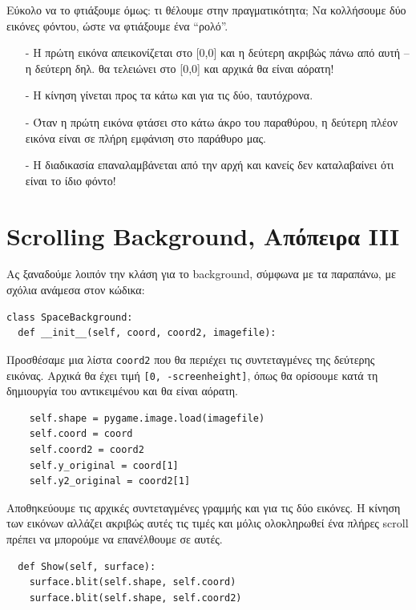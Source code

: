 Εύκολο να το φτιάξουμε όμως: τι θέλουμε στην πραγματικότητα;  Να κολλήσουμε δύο εικόνες φόντου, ώστε να φτιάξουμε ένα ``ρολό''.
%
\begin{itemize}
\item[-] Η πρώτη εικόνα απεικονίζεται στο [0,0] και η δεύτερη ακριβώς πάνω από αυτή -- η δεύτερη δηλ. θα τελειώνει στο [0,0] και αρχικά θα είναι αόρατη!
\item[-] Η κίνηση γίνεται προς τα κάτω και για τις δύο, ταυτόχρονα.
\item[-] Όταν η πρώτη εικόνα φτάσει στο κάτω άκρο του παραθύρου, η δεύτερη πλέον εικόνα είναι σε πλήρη εμφάνιση στο παράθυρο μας.
\item[-] Η διαδικασία επαναλαμβάνεται από την αρχή και κανείς δεν καταλαβαίνει ότι είναι το ίδιο φόντο!
\end{itemize}
%
%
\section{Scrolling Background, Απόπειρα III}
%
Ας ξαναδούμε λοιπόν την κλάση για το background, σύμφωνα με τα παραπάνω, με σχόλια ανάμεσα στον κώδικα:

\begin{verbatim}
class SpaceBackground:
  def __init__(self, coord, coord2, imagefile):
\end{verbatim}

Προσθέσαμε μια λίστα {\tt coord2} που θα περιέχει τις συντεταγμένες της δεύτερης εικόνας. Αρχικά θα έχει τιμή {\tt [0, -screenheight]}, όπως θα ορίσουμε κατά τη δημιουργία του αντικειμένου και θα είναι αόρατη.

\begin{verbatim}
    self.shape = pygame.image.load(imagefile)
    self.coord = coord
    self.coord2 = coord2
    self.y_original = coord[1]
    self.y2_original = coord2[1]
\end{verbatim}

Αποθηκεύουμε τις αρχικές συντεταγμένες γραμμής και για τις δύο εικόνες. Η κίνηση των εικόνων αλλάζει ακριβώς αυτές τις τιμές και μόλις ολοκληρωθεί ένα πλήρες scroll πρέπει να μπορούμε να επανέλθουμε σε αυτές. 

\begin{verbatim}
  def Show(self, surface):
    surface.blit(self.shape, self.coord)
    surface.blit(self.shape, self.coord2)
\end{verbatim}

